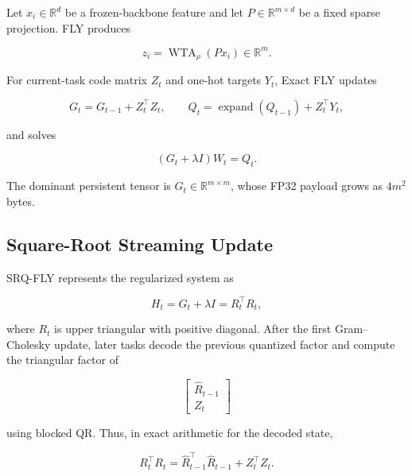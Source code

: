 \documentclass[runningheads]{llncs}
\begin{document}
Let $x_i\in\mathbb{R}^{d}$ be a frozen-backbone feature and let
$P\in\mathbb{R}^{m\times d}$ be a fixed sparse projection. FLY produces

\begin{equation}
z_i=\operatorname{WTA}_{\rho}(Px_i)\in\mathbb{R}^{m}.
\label{eq:wta}
\end{equation}

For current-task code matrix $Z_t$ and one-hot targets $Y_t$, Exact FLY updates

\begin{equation}
G_t=G_{t-1}+Z_t^{\top}Z_t,\qquad
Q_t=\operatorname{expand}(Q_{t-1})+Z_t^{\top}Y_t,
\label{eq:exact-update}
\end{equation}

and solves

\begin{equation}
(G_t+\lambda I)W_t=Q_t.
\label{eq:ridge}
\end{equation}

The dominant persistent tensor is $G_t\in\mathbb{R}^{m\times m}$, whose FP32
payload grows as $4m^2$ bytes.

\subsection{Square-Root Streaming Update}

SRQ-FLY represents the regularized system as

\begin{equation}
H_t=G_t+\lambda I=R_t^{\top}R_t,
\label{eq:square-root}
\end{equation}

where $R_t$ is upper triangular with positive diagonal. After the first
Gram--Cholesky update, later tasks decode the previous quantized factor and
compute the triangular factor of

\begin{equation}
\begin{bmatrix}\widehat R_{t-1}\\Z_t\end{bmatrix}
\label{eq:stacked-qr}
\end{equation}

using blocked QR. Thus, in exact arithmetic for the decoded state,

\begin{equation}
R_t^{\top}R_t=
\widehat R_{t-1}^{\top}\widehat R_{t-1}+Z_t^{\top}Z_t.
\label{eq:qr-identity}
\end{equation}
\end{document}
